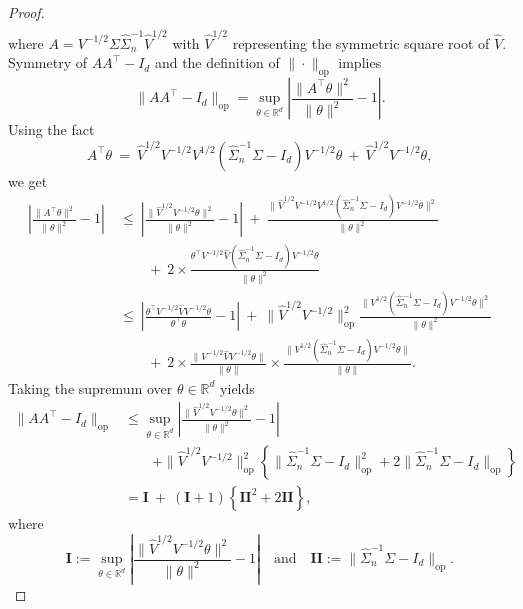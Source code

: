 \documentclass[11pt]{article}
\begin{document}
\begin{appendices}
\begin{proof}
\begin{align*}
\end{align*}
where $A = V^{-1/2}\Sigma\widehat{\Sigma}_n^{-1}\widehat{V}^{1/2}$ with $\widehat{V}^{1/2}$ representing the symmetric square root of $\widehat{V}$. Symmetry of $AA^{\top} - I_d$ and the definition of $\|\cdot\|_{\mathrm{op}}$ implies
\[
\|AA^{\top} - I_d\|_{\mathrm{op}} = \sup_{\theta\in\mathbb{R}^d}\left|\frac{\|A^{\top}\theta\|^2}{\|\theta\|^2} - 1\right|.
\]
Using the fact $$A^{\top}\theta ~=~ \widehat{V}^{1/2}V^{-1/2}V^{1/2}(\widehat{\Sigma}_n^{-1}\Sigma - I_d)V^{-1/2}\theta ~+~ \widehat{V}^{1/2}V^{-1/2}\theta,$$ we get
\begin{align*}
\left|\frac{\|A^{\top}\theta\|^2}{\|\theta\|^2} - 1\right| ~&\le~ \left|\frac{\|\widehat{V}^{1/2}V^{-1/2}\theta\|^2}{\|\theta\|^2} - 1\right| ~+~ \frac{\|\widehat{V}^{1/2}V^{-1/2}V^{1/2}(\widehat{\Sigma}_n^{-1}\Sigma - I_d)V^{-1/2}\theta\|^2}{\|\theta\|^2}\\
~&\qquad+~ 2\times\frac{\theta^{\top}V^{-1/2}\widehat{V}(\widehat{\Sigma}_n^{-1}\Sigma - I_d)V^{-1/2}\theta}{\|\theta\|^2}\\
~&\le~ \left|\frac{\theta^{\top}V^{-1/2}\widehat{V}V^{-1/2}\theta}{\theta^{\top}\theta} - 1\right| ~+~ \|\widehat{V}^{1/2}V^{-1/2}\|_{\mathrm{op}}^2\frac{\|V^{1/2}(\widehat{\Sigma}_n^{-1}\Sigma - I_d)V^{-1/2}\theta\|^2}{\|\theta\|^2}\\
~&\qquad+~ 2\times\frac{\|V^{-1/2}\widehat{V}V^{-1/2}\theta\|}{\|\theta\|}\times\frac{\|V^{1/2}(\widehat{\Sigma}_n^{-1}\Sigma - I_d)V^{-1/2}\theta\|}{\|\theta\|}.
\end{align*}
Taking the supremum over $\theta\in\mathbb{R}^d$ yields
\begin{equation}\label{eq:main-inequality-sandwich}
\begin{split}
\|AA^{\top} - I_d\|_{\mathrm{op}} &\le \sup_{\theta\in\mathbb{R}^d}\left|\frac{\|\widehat{V}^{1/2}V^{-1/2}\theta\|^2}{\|\theta\|^2} - 1\right|\\ &\qquad+ \|\widehat{V}^{1/2}V^{-1/2}\|_{\mathrm{op}}^2\left\{\|\widehat{\Sigma}_n^{-1}\Sigma - I_d\|_{\mathrm{op}}^2 + 2\|\widehat{\Sigma}_n^{-1}\Sigma - I_d\|_{\mathrm{op}}\right\}\\
&= \mathbf{I} ~+~ (\mathbf{I} + 1)\left\{\mathbf{II}^2 + 2\mathbf{II}\right\},
\end{split}
\end{equation}
where
\begin{equation}\label{eq:decomposition-sandwich-error}
\mathbf{I} := \sup_{\theta\in\mathbb{R}^d}\left|\frac{\|\widehat{V}^{1/2}V^{-1/2}\theta\|^2}{\|\theta\|^2} - 1\right|\quad\mbox{and}\quad \mathbf{II} := \|\widehat{\Sigma}_n^{-1}\Sigma - I_d\|_{\mathrm{op}}.

\end{equation}
\end{proof}
\end{appendices}
\end{document}
